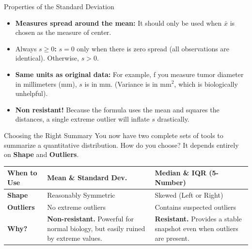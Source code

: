 \documentclass[aspectratio=169]{beamer}
\begin{document}
\begin{frame}{Properties of the Standard Deviation}
\begin{itemize}
	\item \textbf{Measures spread around the mean:} It should only be used when $\bar{x}$ is chosen as the measure of center.
	\item Always \textbf{$s \ge 0$:} $s = 0$ only when there is zero spread (all observations are identical). Otherwise, $s > 0$.
	\item \textbf{Same units as original data:} For example, f you measure tumor diameter in millimeters (mm), $s$ is in mm. (Variance is in mm$^2$, which is biologically unhelpful).
	\item \textbf{Non resistant!} Because the formula uses the mean and squares the distances, a single extreme outlier will inflate $s$ drastically.
\end{itemize}
\end{frame}


\begin{frame}{Choosing the Right Summary}
You now have two complete sets of tools to summarize a quantitative distribution. How do you choose? It depends entirely on \textbf{Shape} and \textbf{Outliers}.
\vspace{0.2cm}
\begin{table}
\centering
\small
\begin{tabular}{p{2cm}p{4cm}p{4cm}}
\toprule
\textbf{When to Use} & \textbf{Mean \& Standard Dev.} & \textbf{Median \& IQR (5-Number)} \\
\midrule
\textbf{Shape} & Reasonably Symmetric & Skewed (Left or Right) \\
\textbf{Outliers} & No extreme outliers & Contains suspected outliers \\
\textbf{Why?} & \textbf{Non-resistant.} Powerful for normal biology, but easily ruined by extreme values. & \textbf{Resistant.} Provides a stable snapshot even when outliers are present. \\
\bottomrule
\end{tabular}
\end{table}
\end{frame}
\end{document}
